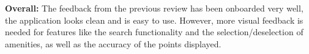 \textbf{Overall: }
The feedback from the previous review has been onboarded very well, the application looks clean and is easy to use. However, more visual feedback is needed for features like the search functionality and the selection/deselection of amenities, as well as the accuracy of the points displayed.